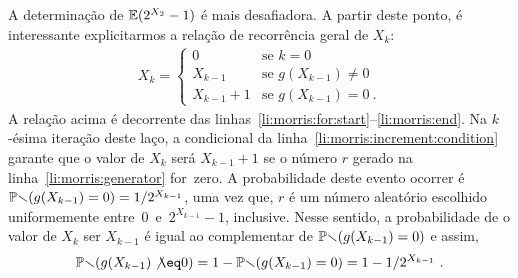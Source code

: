A determinação de $\mathbb{E}(2^{X_2} - 1)$ é mais desafiadora. A partir deste ponto, é interessante explicitarmos a relação
de recorrência geral de $X_k$:
\begin{align}
  \label{morris:rec:xk}
X_k = \begin{cases} 
  0                 & \mbox{se } k = 0 \\[2mm]
  X_{k-1}           & \mbox{se } g(X_{k-1}) \neq 0 \\[2mm]
  X_{k-1} + 1       & \mbox{se } g(X_{k-1}) =  0\ .  
\end{cases}
\end{align}
A relação acima é decorrente das linhas~\ref{li:morris:for:start}--\ref{li:morris:end}. Na $k$-ésima iteração deste 
laço, a condicional da linha~\ref{li:morris:increment:condition} garante que o valor de $X_k$ será $X_{k-1} + 1$ se o 
número $r$ gerado na linha~\ref{li:morris:generator} for~zero. A probabilidade deste evento ocorrer é 
$\mathbb{Pr}(g(X_{k-1}) = 0) = 1/2^{X_{k-1}}$, uma vez que, $r$ é um número aleatório escolhido uniformemente 
entre~$0$~e~$2^{X_{k-1}} - 1$, inclusive. Nesse sentido, a probabilidade de o valor de $X_k$ ser $X_{k - 1}$ é igual ao 
complementar de $\mathbb{Pr}(g(X_{k-1}) = 0)$ e assim, 
\[\Pbb(g(X_{k-1}) \not\eq 0) = 1 - \Pbb(g(X_{k-1}) = 0) = 1 - 1/2^{X_{k-1}} \ . \]

